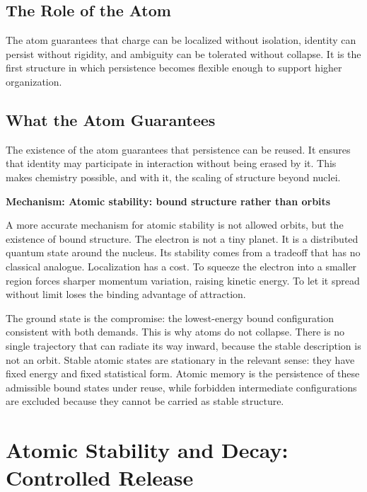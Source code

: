 \documentclass[11pt,twoside,openright]{book}
\newenvironment{mechanismbox}[1]
  {\begin{framed}\noindent\textbf{Mechanism: #1}\par\medskip}
  {\end{framed}}
\begin{document}
\section*{The Role of the Atom}

The atom guarantees that charge can be localized without isolation, identity can persist without rigidity, and ambiguity can be tolerated without collapse. It is the first structure in which persistence becomes flexible enough to support higher organization.

\section*{What the Atom Guarantees}

The existence of the atom guarantees that persistence can be reused. It ensures that identity may participate in interaction without being erased by it. This makes chemistry possible, and with it, the scaling of structure beyond nuclei.

\begin{mechanismbox}{Atomic stability: bound structure rather than orbits}

A more accurate mechanism for atomic stability is not allowed orbits, but the existence of bound structure. The electron is not a tiny planet. It is a distributed quantum state around the nucleus. Its stability comes from a tradeoff that has no classical analogue. Localization has a cost. To squeeze the electron into a smaller region forces sharper momentum variation, raising kinetic energy. To let it spread without limit loses the binding advantage of attraction.

The ground state is the compromise: the lowest-energy bound configuration consistent with both demands. This is why atoms do not collapse. There is no single trajectory that can radiate its way inward, because the stable description is not an orbit. Stable atomic states are stationary in the relevant sense: they have fixed energy and fixed statistical form. Atomic memory is the persistence of these admissible bound states under reuse, while forbidden intermediate configurations are excluded because they cannot be carried as stable structure.

\end{mechanismbox}

\chapter{Atomic Stability and Decay: Controlled Release}
\end{document}
